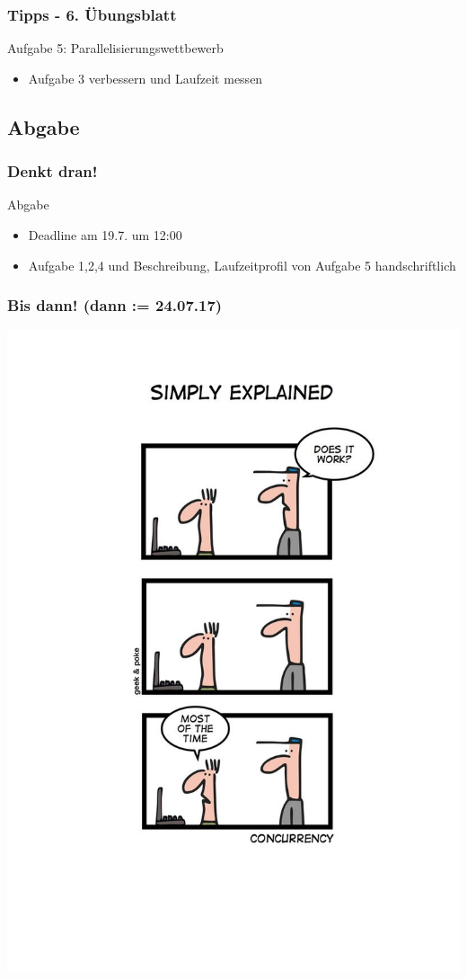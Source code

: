 \documentclass[18pt]{beamer}
\begin{document}
	\begin{frame}
		\frametitle{Tipps - 6. Übungsblatt}
		\begin{exampleblock}{Aufgabe 5: Parallelisierungswettbewerb}
			\begin{itemize}
				\item Aufgabe 3 verbessern und Laufzeit messen
			\end{itemize}
		\end{exampleblock}
	\end{frame}

	\subsection{Abgabe}
	\begin{frame}
		\frametitle{Denkt dran!}
		\begin{alertblock}{Abgabe}
			\begin{itemize}
				\item Deadline am 19.7. um 12:00
				\item Aufgabe 1,2,4 und Beschreibung, Laufzeitprofil von Aufgabe 5 handschriftlich
			\end{itemize}
		\end{alertblock}
	\end{frame}

	\begin{frame}
		\frametitle{Bis dann! (dann  := 24.07.17)}
		\centering
		\includegraphics[scale=1.0]{./comics/geek_and_poke_concurrency.jpg}
	\end{frame}
\end{document}
